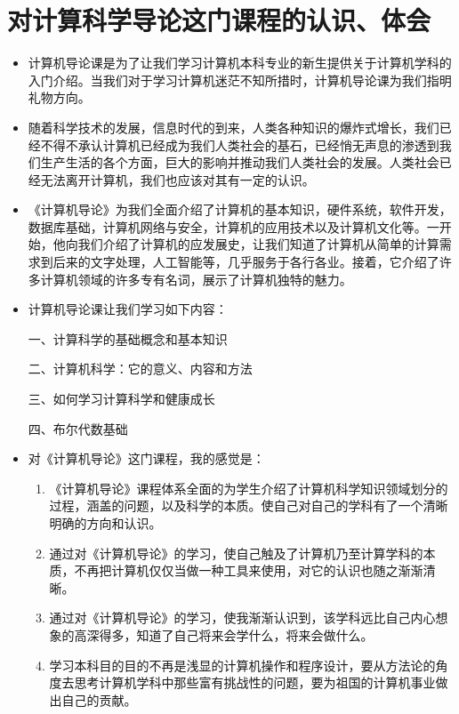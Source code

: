 \documentclass{article}
\begin{document}
\section{对计算科学导论这门课程的认识、体会}
\begin{itemize}
    \item 计算机导论课是为了让我们学习计算机本科专业的新生提供关于计算机学科的入门介绍。当我们对于学习计算机迷茫不知所措时，计算机导论课为我们指明礼物方向。
    \item 随着科学技术的发展，信息时代的到来，人类各种知识的爆炸式增长，我们已经不得不承认计算机已经成为我们人类社会的基石，已经悄无声息的渗透到我们生产生活的各个方面，巨大的影响并推动我们人类社会的发展。人类社会已经无法离开计算机，我们也应该对其有一定的认识。
    \item 《计算机导论》为我们全面介绍了计算机的基本知识，硬件系统，软件开发，数据库基础，计算机网络与安全，计算机的应用技术以及计算机文化等。一开始，他向我们介绍了计算机的应发展史，让我们知道了计算机从简单的计算需求到后来的文字处理，人工智能等，几乎服务于各行各业。接着，它介绍了许多计算机领域的许多专有名词，展示了计算机独特的魅力。
    \item 计算机导论课让我们学习如下内容：

一、计算科学的基础概念和基本知识

二、计算机科学：它的意义、内容和方法

三、如何学习计算科学和健康成长

四、布尔代数基础

    \item 对《计算机导论》这门课程，我的感觉是：

\begin{enumerate}
	\item 《计算机导论》课程体系全面的为学生介绍了计算机科学知识领域划分的过程，涵盖的问题，以及科学的本质。使自己对自己的学科有了一个清晰明确的方向和认识。
	\item 通过对《计算机导论》的学习，使自己触及了计算机乃至计算学科的本质，不再把计算机仅仅当做一种工具来使用，对它的认识也随之渐渐清晰。
	\item 通过对《计算机导论》的学习，使我渐渐认识到，该学科远比自己内心想象的高深得多，知道了自己将来会学什么，将来会做什么。
	\item 学习本科目的目的不再是浅显的计算机操作和程序设计，要从方法论的角度去思考计算机学科中那些富有挑战性的问题，要为祖国的计算机事业做出自己的贡献。
\end{enumerate}

\end{itemize}
\par
\end{document}
